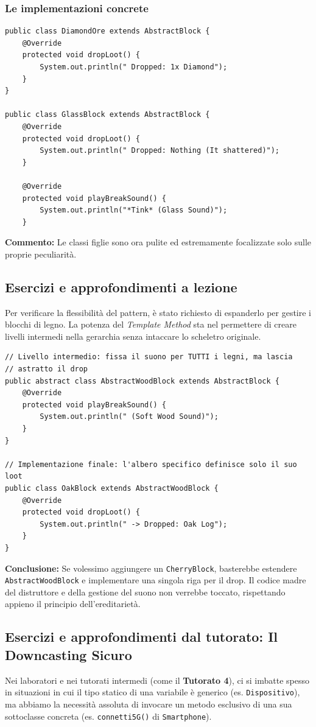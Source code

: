 \documentclass[12pt, a4paper]{article}
\begin{document}
\subsubsection{Le implementazioni concrete}
\begin{verbatim}
public class DiamondOre extends AbstractBlock {
    @Override
    protected void dropLoot() {
        System.out.println(" Dropped: 1x Diamond");
    }
}

public class GlassBlock extends AbstractBlock {
    @Override
    protected void dropLoot() {
        System.out.println(" Dropped: Nothing (It shattered)");
    }

    @Override
    protected void playBreakSound() {
        System.out.println("*Tink* (Glass Sound)");
    }
\end{verbatim}
\textbf{Commento:} Le classi figlie sono ora pulite ed estremamente focalizzate solo sulle proprie peculiarità.

\subsection{Esercizi e approfondimenti a lezione}
Per verificare la flessibilità del pattern, è stato richiesto di espanderlo per gestire i blocchi di legno. La potenza del \textit{Template Method} sta nel permettere di creare livelli intermedi nella gerarchia senza intaccare lo scheletro originale.

\begin{verbatim}
// Livello intermedio: fissa il suono per TUTTI i legni, ma lascia 
// astratto il drop
public abstract class AbstractWoodBlock extends AbstractBlock {
    @Override
    protected void playBreakSound() { 
        System.out.println(" (Soft Wood Sound)");
    }
}

// Implementazione finale: l'albero specifico definisce solo il suo loot
public class OakBlock extends AbstractWoodBlock {
    @Override
    protected void dropLoot() { 
        System.out.println(" -> Dropped: Oak Log");
    }
}
\end{verbatim}
\textbf{Conclusione:} Se volessimo aggiungere un \texttt{CherryBlock}, basterebbe estendere \\ \texttt{AbstractWoodBlock} e implementare una singola riga per il drop. Il codice madre del distruttore e della gestione del suono non verrebbe toccato, rispettando appieno il principio dell'ereditarietà.

\subsection{Esercizi e approfondimenti dal tutorato: Il Downcasting Sicuro}
Nei laboratori e nei tutorati intermedi (come il \textbf{Tutorato 4}), ci si imbatte spesso in situazioni in cui il tipo statico di una variabile è generico (es. \texttt{Dispositivo}), ma abbiamo la necessità assoluta di invocare un metodo esclusivo di una sua sottoclasse concreta (es. \texttt{connetti5G()} di \texttt{Smartphone}). 
\end{document}
